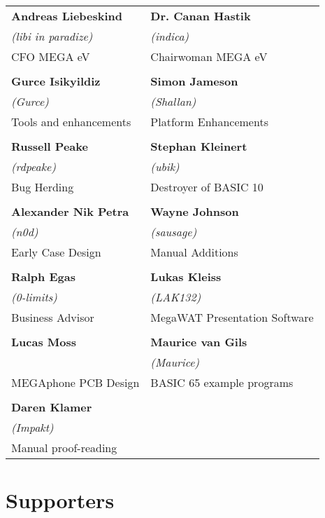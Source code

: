 \begin{tabular}{p{6cm}p{6cm}}

{\large\bf Andreas Liebeskind}     & {\large\bf Dr. Canan Hastik} \\
 \textit{(libi in paradize)}       & \textit{(indica)} \\
CFO MEGA eV                        & Chairwoman MEGA eV \\
& \\
{\large\bf Gurce Isikyildiz}       & {\large\bf Simon Jameson} \\
 \textit{(Gurce)}                  &  \textit{(Shallan)} \\
Tools and enhancements             & Platform Enhancements \\
& \\
{\large\bf Russell Peake}          & {\large\bf Stephan Kleinert} \\
  \textit{(rdpeake)}               & \textit{(ubik)}        \\
Bug Herding                        & Destroyer of BASIC 10     \\
& \\
{\large\bf Alexander Nik Petra}    & {\large\bf Wayne Johnson} \\
 \textit{(n0d)}                    &  \textit{(sausage)} \\
Early Case Design                  & Manual Additions \\
& \\
{\large\bf Ralph Egas}             & {\large\bf Lukas Kleiss} \\
 \textit{(0-limits)}               & \textit{(LAK132)} \\
Business Advisor                   & MegaWAT Presentation Software \\
& \\
{\large\bf Lucas Moss}             & {\large\bf Maurice van Gils }  \\
                                   & \textit{(Maurice)}  \\
MEGAphone PCB Design               & BASIC 65 example programs \\
& \\
{\large\bf Daren Klamer}           & \\
 \textit{(Impakt)}                 & \\
Manual proof-reading               & \\
\end{tabular}

\newpage
\section{Supporters}

